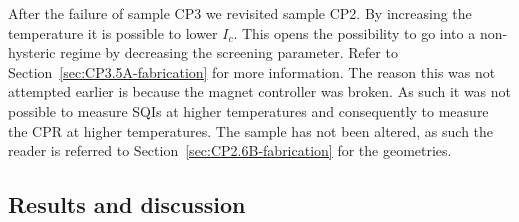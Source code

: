 After the failure of sample CP3 we revisited sample CP2. By increasing the temperature it is possible to lower $I_c$. This opens the possibility to go into a non-hysteric regime by decreasing the screening parameter. Refer to Section~\ref{sec:CP3.5A-fabrication} for more information. The reason this was not attempted earlier is because the magnet controller was broken. As such it was not possible to measure SQIs at higher temperatures and consequently to measure the CPR at higher temperatures. The sample has not been altered, as such the reader is referred to Section~\ref{sec:CP2.6B-fabrication} for the geometries.

\subsection{Results and discussion}
